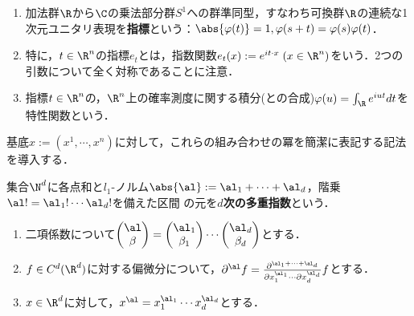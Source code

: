 \documentclass[uplatex,dvipdfmx]{jsreport}
\begin{document}
\begin{definition}\mbox{}
    \begin{enumerate}
        \item 加法群$\R$から$\C$の乗法部分群$S^1$への群準同型，すなわち可換群$\R$の連続な1次元ユニタリ表現を\textbf{指標}という：$\abs{\varphi(t)}=1,\varphi(s+t)=\varphi(s)\varphi(t)$．
        \item 特に，$t\in\R^n$の指標$e_t$とは，指数関数$e_t(x):=e^{it\cdot x}\;(x\in\R^n)$をいう．2つの引数について全く対称であることに注意．
        \item 指標$t\in\R^n$の，$\R^n$上の確率測度に関する積分(との合成)$\varphi(u)=\int_\R e^{iut}dt$を特性関数という．
    \end{enumerate}
\end{definition}

\begin{tcolorbox}[colframe=ForestGreen, colback=ForestGreen!10!white,breakable,colbacktitle=ForestGreen!40!white,coltitle=black,fonttitle=\bfseries\sffamily,
    title=]
    基底$x:=(x^1,\cdots,x^n)$に対して，これらの組み合わせの冪を簡潔に表記する記法を導入する．
\end{tcolorbox}

\begin{definition}
    集合$\N^d$に各点和と$l_1$-ノルム$\abs{\al}:=\al_1+\cdots+\al_d$，階乗$\al!=\al_1!\cdots\al_d!$を備えた区間
    の元を\textbf{$d$次の多重指数}という．
    \begin{enumerate}
        \item 二項係数について$\begin{pmatrix}\al\\\beta\end{pmatrix}=\begin{pmatrix}\al_1\\\beta_1\end{pmatrix}\cdots\begin{pmatrix}\al_d\\\beta_d\end{pmatrix}$とする．
        \item $f\in C^d(\R^d)$に対する偏微分について，$\partial^\al f=\frac{\partial^{\al_1+\cdots+\al_d}}{\partial x_1^{\al_1}\cdots\partial x_d^{\al_d}}f$とする．
        \item $x\in\R^d$に対して，$x^\al=x_1^{\al_1}\cdots x_d^{\al_d}$とする．
    \end{enumerate}
\end{definition}
\end{document}
